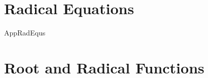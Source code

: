 \section{Radical Equations}

{AppRadEqus}

\newpage

\section{Root and Radical Functions}



\newpage

\begin{comment}

\section{Power Functions}



\newpage


\section{Equations and Inequalities involving Power Functions}



\newpage
\end{comment}
